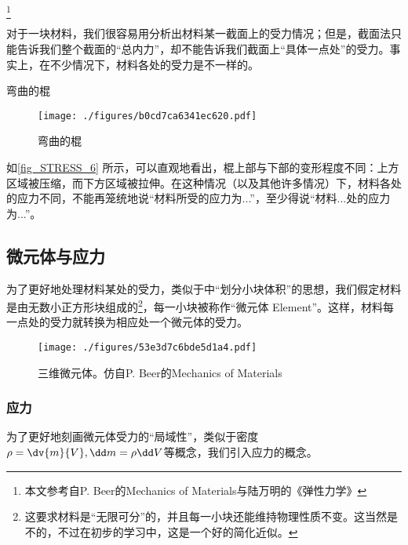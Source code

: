 
\begin{issues}
\issueTODO
\end{issues}

\footnote{本文参考自P. Beer的Mechanics of Materials与陆万明的《弹性力学》}

对于一块材料，我们很容易用分析出材料某一截面上的受力情况；但是，截面法只能告诉我们整个截面的“总内力”，却不能告诉我们截面上“具体一点处”的受力。事实上，在不少情况下，材料各处的受力是不一样的。

\begin{example}{弯曲的棍}
\begin{figure}[ht]
\centering
\texttt{[image: ./figures/b0cd7ca6341ec620.pdf]}
\caption{弯曲的棍} \label{fig_STRESS_6}
\end{figure}
如\autoref{fig_STRESS_6} 所示，可以直观地看出，棍上部与下部的变形程度不同：上方区域被压缩，而下方区域被拉伸。在这种情况（以及其他许多情况）下，材料各处的应力不同，不能再笼统地说“材料所受的应力为...”，至少得说“材料...处的应力为...”。

\end{example}

\subsection{微元体与应力}
为了更好地处理材料某处的受力，类似于中“划分小块体积”的思想，我们假定材料是由无数小正方形块组成的\footnote{这要求材料是“无限可分”的，并且每一小块还能维持物理性质不变。这当然是不的，不过在初步的学习中，这是一个好的简化近似。}，每一小块被称作“微元体 Element”。这样，材料每一点处的受力就转换为相应处一个微元体的受力。

\begin{figure}[ht]
\centering
\texttt{[image: ./figures/53e3d7c6bde5d1a4.pdf]}
\caption{三维微元体。仿自P. Beer的Mechanics of Materials} \label{fig_STRESS_1}
\end{figure}

\subsubsection{应力}

为了更好地刻画微元体受力的“局域性”，类似于密度$\rho=\dv{m}{V}, \dd m = \rho \dd V$等概念，我们引入应力的概念。

